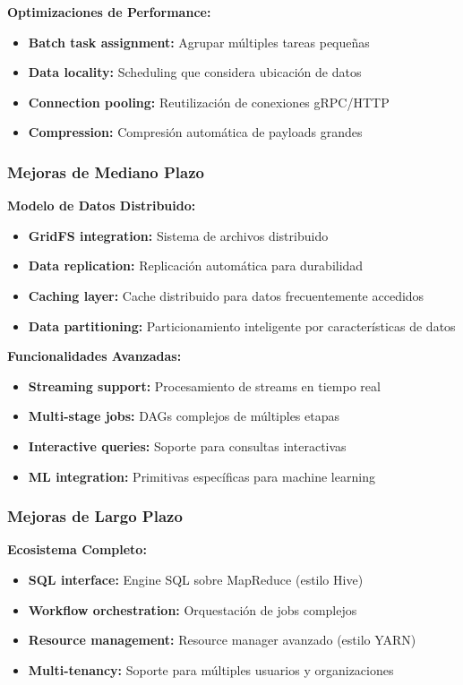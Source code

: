 \textbf{Optimizaciones de Performance:}
\begin{itemize}
    \item \textbf{Batch task assignment:} Agrupar múltiples tareas pequeñas
    \item \textbf{Data locality:} Scheduling que considera ubicación de datos
    \item \textbf{Connection pooling:} Reutilización de conexiones gRPC/HTTP
    \item \textbf{Compression:} Compresión automática de payloads grandes
\end{itemize}

\subsubsection{Mejoras de Mediano Plazo}

\textbf{Modelo de Datos Distribuido:}
\begin{itemize}
    \item \textbf{GridFS integration:} Sistema de archivos distribuido
    \item \textbf{Data replication:} Replicación automática para durabilidad
    \item \textbf{Caching layer:} Cache distribuido para datos frecuentemente accedidos
    \item \textbf{Data partitioning:} Particionamiento inteligente por características de datos
\end{itemize}

\textbf{Funcionalidades Avanzadas:}
\begin{itemize}
    \item \textbf{Streaming support:} Procesamiento de streams en tiempo real
    \item \textbf{Multi-stage jobs:} DAGs complejos de múltiples etapas
    \item \textbf{Interactive queries:} Soporte para consultas interactivas
    \item \textbf{ML integration:} Primitivas específicas para machine learning
\end{itemize}

\subsubsection{Mejoras de Largo Plazo}

\textbf{Ecosistema Completo:}
\begin{itemize}
    \item \textbf{SQL interface:} Engine SQL sobre MapReduce (estilo Hive)
    \item \textbf{Workflow orchestration:} Orquestación de jobs complejos
    \item \textbf{Resource management:} Resource manager avanzado (estilo YARN)
    \item \textbf{Multi-tenancy:} Soporte para múltiples usuarios y organizaciones
\end{itemize}

